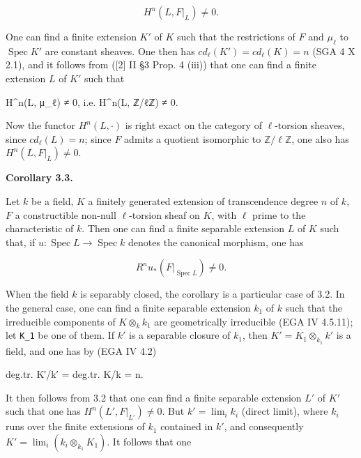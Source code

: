\documentclass[
]{article}
\newenvironment{Shaded}{}{}
\newcommand{\NormalTok}[1]{#1}
\begin{document}
\[
H^{n}(L, F|_{L}) \neq 0.
\]

One can find a finite extension \(K'\) of \(K\) such that the
restrictions of \(F\) and \(\mu_{\ell}\) to \(\operatorname{Spec} K'\)
are constant sheaves. One then has \(cd_{\ell}(K') = cd_{\ell}(K) = n\)
(SGA 4 X 2.1), and it follows from ({[}2{]} II §3 Prop. 4 (iii)) that
one can find a finite extension \(L\) of \(K'\) such that

\begin{Shaded}
\begin{Highlighting}[]
\NormalTok{H\^{}n(L, μ\_ℓ) ≠ 0, i.e. H\^{}n(L, ℤ/ℓℤ) ≠ 0.}
\end{Highlighting}
\end{Shaded}

Now the functor \(H^{n}(L, \cdot)\) is right exact on the category of
\(\ell\)-torsion sheaves, since \(cd_{\ell}(L) = n\); since \(F\) admits
a quotient isomorphic to \(\mathbb{Z}/\ell \mathbb{Z}\), one also has
\(H^{n}(L, F|_{L}) \neq 0\).

\textbf{Corollary 3.3.}

Let \(k\) be a field, \(K\) a finitely generated extension of
transcendence degree \(n\) of \(k\), \(F\) a constructible non-null
\(\ell\)-torsion sheaf on \(K\), with \(\ell\) prime to the
characteristic of \(k\). Then one can find a finite separable extension
\(L\) of \(K\) such that, if
\(u : \operatorname{Spec} L \to \operatorname{Spec} k\) denotes the
canonical morphism, one has

\[
R^{n} u_{*}(F|_{\operatorname{Spec} L}) \neq 0.
\]

When the field \(k\) is separably closed, the corollary is a particular
case of 3.2. In the general case, one can find a finite separable
extension \(k_{1}\) of \(k\) such that the irreducible components of
\(K \otimes_{k} k_{1}\) are geometrically irreducible (EGA IV 4.5.11);
let \texttt{K\_1} be one of them. If \(k'\) is a separable closure of
\(k_{1}\), then \(K' = K_{1} \otimes_{k_{1}} k'\) is a field, and one
has by (EGA IV 4.2)

\begin{Shaded}
\begin{Highlighting}[]
\NormalTok{deg.tr. K′/k′ = deg.tr. K/k = n.}
\end{Highlighting}
\end{Shaded}

It then follows from 3.2 that one can find a finite separable extension
\(L'\) of \(K'\) such that one has \(H^{n}(L', F|_{L'}) \neq 0\). But
\(k' = \lim_{i} k_{i}\) (direct limit), where \(k_{i}\) runs over the
finite extensions of \(k_{1}\) contained in \(k'\), and consequently
\(K' = \lim_{i} (k_{i} \otimes_{k_{1}} K_{1})\). It follows that one
\end{document}
